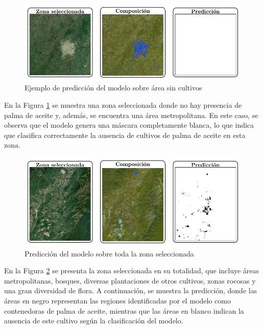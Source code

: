 \begin{figure}[t]
 \centering
 \includegraphics[width=\textwidth]{example_without_crops}
 \caption{Ejemplo de predicción del modelo sobre área sin cultivos}
 \label{fig:example_without_crops}
\end{figure}

En la Figura \ref{fig:example_without_crops} se muestra una zona seleccionada donde no hay presencia de palma de aceite y, además, se encuentra una área metropolitana. En este caso, se observa que el modelo genera una máscara completamente blanca, lo que indica que clasifica correctamente la ausencia de cultivos de palma de aceite en esta zona.

\begin{figure}[t]
 \centering
 \includegraphics[width=\textwidth]{full_prediction}
 \caption{Predicción del modelo sobre toda la zona seleccionada}
 \label{fig:full_prediction}
\end{figure}

En la Figura \ref{fig:full_prediction} se presenta la zona seleccionada en su totalidad, que incluye áreas metropolitanas, bosques, diversas plantaciones de otros cultivos, zonas rocosas y una gran diversidad de flora. A continuación, se muestra la predicción, donde las áreas en negro representan las regiones identificadas por el modelo como contenedoras de palma de aceite, mientras que las áreas en blanco indican la ausencia de este cultivo según la clasificación del modelo.

